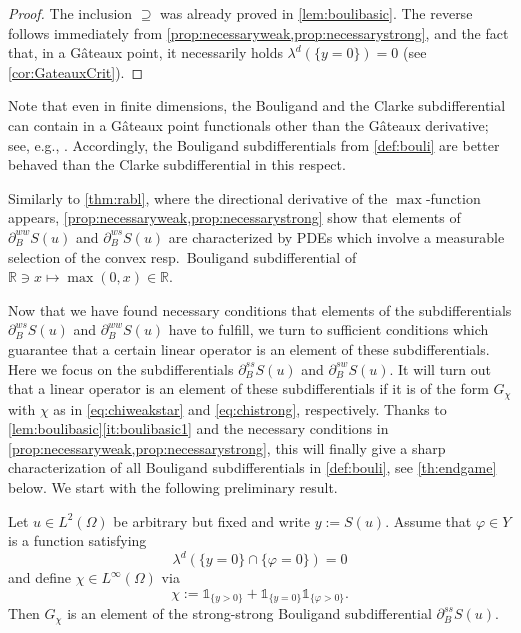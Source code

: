 \documentclass[reqno]{shinyart}
\begin{document}
\begin{proof}
    The inclusion $\supseteq$ was already proved in \cref{lem:boulibasic}.
    The reverse follows immediately from \cref{prop:necessaryweak,prop:necessarystrong}, and the fact that, in a G\^ateaux point, 
    it necessarily holds $\lambda^d(\{y = 0\}) = 0$ (see \cref{cor:GateauxCrit}).
\end{proof}

\begin{remark}
    Note that even in finite dimensions, the
    Bouligand and the Clarke subdifferential can contain in a G\^ateaux point functionals 
    other than the G\^ateaux derivative; see, e.g., \cite[Ex.~2.2.3]{Clarke:1990}. 
    Accordingly, the Bouligand subdifferentials from \cref{def:bouli} 
    are better behaved than the Clarke subdifferential in this respect.
\end{remark}

\begin{remark}\label{rem:subdiffmax}
    Similarly to \cref{thm:rabl}, 
    where the directional derivative of the $\max$-function appears, 
    \cref{prop:necessaryweak,prop:necessarystrong} show that elements of  
    $\partial_{B}^{ww} S(u)$ and $\partial_{B}^{ws} S(u)$ are characterized by PDEs which involve 
    a measurable selection of the convex resp.~Bouligand subdifferential of 
    ${\mathbb{R}} \ni x \mapsto \max(0, x)\in {\mathbb{R}}$. 
\end{remark}

Now that we have found necessary conditions that elements of the subdifferentials 
$\partial_{B}^{ws} S(u)$ and $\partial_{B}^{ww} S(u)$ have to fulfill, we turn to 
sufficient conditions which guarantee that a certain linear operator is an 
element of these subdifferentials. Here we focus on the subdifferentials 
$\partial_{B}^{ss} S(u)$ and $\partial_{B}^{sw} S(u)$. It will turn out that 
a linear operator is an element of these subdifferentials if it is of the form 
$G_\chi$ with $\chi$ as in \eqref{eq:chiweakstar} and \eqref{eq:chistrong}, respectively.
Thanks to \cref{lem:boulibasic}\ref{it:boulibasic1} and the necessary conditions in
\cref{prop:necessaryweak,prop:necessarystrong}, this will  
finally give a sharp characterization of all Bouligand subdifferentials 
in \cref{def:bouli}, 
see \cref{th:endgame} below. We start with the following preliminary result.

\begin{lemma}\label{lem:preliminarycharacterization}
    Let $u \in L^2(\Omega)$ be arbitrary but fixed and write $y := S(u)$.
    Assume that $\varphi \in Y$ is a function satisfying
    \begin{equation}\label{eq:nullsep}
        \lambda^d(\{y =0\} \cap \{\varphi = 0\}) = 0
    \end{equation}
    and define $\chi \in L^\infty(\Omega)$ via
    \begin{equation}\label{eq:defchi}
        \chi := \mathbb{1}_{\{y>0\}} + \mathbb{1}_{\{y=0\} } \mathbb{1}_{  \{\varphi > 0\}}.
    \end{equation}  
    Then $G_\chi$ is an element of the strong-strong Bouligand subdifferential $\partial_B^{ss} S(u)$.
\end{lemma}
\end{document}
